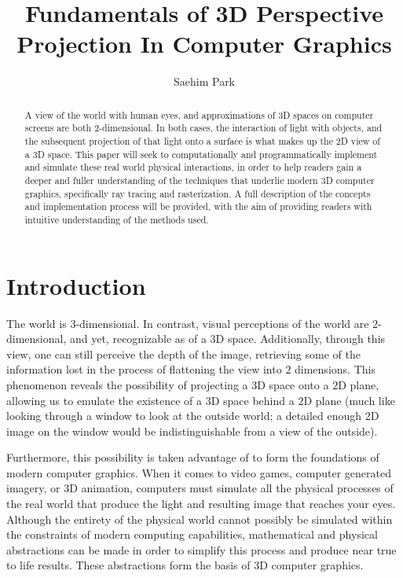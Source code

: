 \documentclass[a4paper]{article}
\author{Saehim Park}
\title{Fundamentals of 3D Perspective Projection In Computer Graphics}
\begin{document}
 
\maketitle

\begin{abstract}
    A view of the world with human eyes, and approximations of 3D spaces on computer screens are both 2-dimensional. In both cases, the interaction of light with objects, and the subsequent projection of that light onto a surface is what makes up the 2D view of a 3D space. This paper will seek to computationally and programmatically implement and simulate these real world physical interactions, in order to help readers gain a deeper and fuller understanding of the techniques that underlie modern 3D computer graphics, specifically ray tracing and rasterization. A full description of the concepts and implementation process will be provided, with the aim of providing readers with intuitive understanding of the methods used.
\end{abstract}

\tableofcontents
\listoffigures
\newpage



\section{Introduction}
The world is $3$-dimensional. In contrast, visual perceptions of the world are $2$-dimensional, and yet, recognizable as of a $3$D space. Additionally, through this view, one can still perceive the depth of the image, retrieving some of the information lost in the process of flattening the view into $2$ dimensions. This phenomenon reveals the possibility of projecting a $3$D space onto a $2$D plane, allowing us to emulate the existence of a $3$D space behind a $2$D plane (much like looking through a window to look at the outside world; a detailed enough $2$D image on the window would be indistinguishable from a view of the outside).

Furthermore, this possibility is taken advantage of to form the foundations of modern computer graphics. When it comes to video games, computer generated imagery, or $3$D animation, computers must simulate all the physical processes of the real world that produce the light and resulting image that reaches your eyes. Although the entirety of the physical world cannot possibly be simulated within the constraints of modern computing capabilities, mathematical and physical abstractions can be made in order to simplify this process and produce near true to life results. These abstractions form the basis of $3$D computer graphics.
\end{document}
